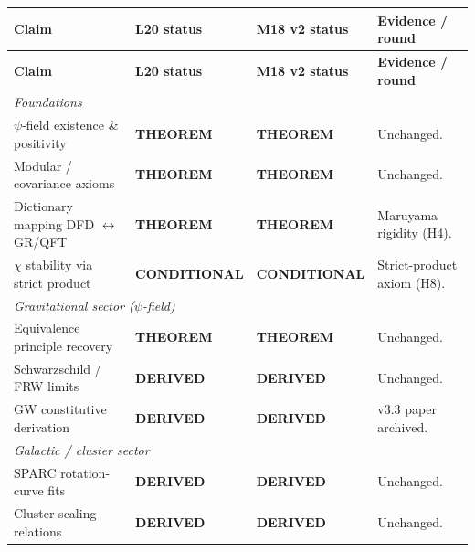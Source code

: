 \documentclass[11pt]{article}
\newcommand{\THM}{\textcolor{thmcol}{\textbf{THEOREM}}}
\newcommand{\DER}{\textcolor{dercol}{\textbf{DERIVED}}}
\newcommand{\CON}{\textcolor{condcol}{\textbf{CONDITIONAL}}}
\begin{document}
\renewcommand{\arraystretch}{1.25}
\begin{longtable}{p{} p{} p{} p{}}
\toprule
\textbf{Claim} & \textbf{L20 status} & \textbf{M18 v2 status} & \textbf{Evidence / round} \\
\midrule
\endfirsthead
\toprule
\textbf{Claim} & \textbf{L20 status} & \textbf{M18 v2 status} & \textbf{Evidence / round} \\
\midrule
\endhead

\multicolumn{4}{l}{\textit{Foundations}} \\
\midrule
$\psi$-field existence \& positivity & \THM & \THM & Unchanged. \\
Modular / covariance axioms & \THM & \THM & Unchanged. \\
Dictionary mapping DFD $\leftrightarrow$ GR/QFT & \THM & \THM & Maruyama rigidity (H4). \\
$\chi$ stability via strict product & \CON & \CON & Strict-product axiom (H8). \\
\midrule

\multicolumn{4}{l}{\textit{Gravitational sector ($\psi$-field)}} \\
\midrule
Equivalence principle recovery & \THM & \THM & Unchanged. \\
Schwarzschild / FRW limits & \DER & \DER & Unchanged. \\
GW constitutive derivation & \DER & \DER & v3.3 paper archived. \\
\midrule

\multicolumn{4}{l}{\textit{Galactic / cluster sector}} \\
\midrule
SPARC rotation-curve fits & \DER & \DER & Unchanged. \\
Cluster scaling relations & \DER & \DER & Unchanged. \\
\midrule


\end{longtable}
\end{document}
